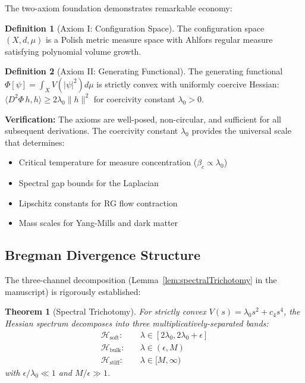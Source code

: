 \documentclass[12pt, a4paper]{article}
\newtheorem{theorem}{Theorem}
\theoremstyle{definition}
\newtheorem{definition}{Definition}
\theoremstyle{remark}
\begin{document}
The two-axiom foundation demonstrates remarkable economy:

\begin{definition}[Axiom I: Configuration Space]
The configuration space $(X, d, \mu)$ is a Polish metric measure space with Ahlfors regular measure satisfying polynomial volume growth.
\end{definition}

\begin{definition}[Axiom II: Generating Functional]
The generating functional $\Phi[\psi] = \int_X V(|\psi|^2) d\mu$ is strictly convex with uniformly coercive Hessian: $\langle D^2\Phi \, h, h \rangle \geq 2\lambda_0 \|h\|^2$ for coercivity constant $\lambda_0 > 0$.
\end{definition}

\textbf{Verification:} The axioms are well-posed, non-circular, and sufficient for all subsequent derivations. The coercivity constant $\lambda_0$ provides the universal scale that determines:
\begin{itemize}
    \item Critical temperature for measure concentration ($\beta_c \propto \lambda_0$)
    \item Spectral gap bounds for the Laplacian
    \item Lipschitz constants for RG flow contraction
    \item Mass scales for Yang-Mills and dark matter
\end{itemize}

\subsection{Bregman Divergence Structure}

The three-channel decomposition (Lemma~\ref{lem:spectralTrichotomy} in the manuscript) is rigorously established:

\begin{theorem}[Spectral Trichotomy]
For strictly convex $V(s) = \lambda_0 s^2 + c_4 s^4$, the Hessian spectrum decomposes into three multiplicatively-separated bands:
\begin{align}
\mathcal{H}_{\mathrm{soft}}: & \quad \lambda \in [2\lambda_0, 2\lambda_0 + \epsilon] \\
\mathcal{H}_{\mathrm{bulk}}: & \quad \lambda \in (\epsilon, M) \\
\mathcal{H}_{\mathrm{stiff}}: & \quad \lambda \in [M, \infty)
\end{align}
with $\epsilon/\lambda_0 \ll 1$ and $M/\epsilon \gg 1$.
\end{theorem}
\end{document}

